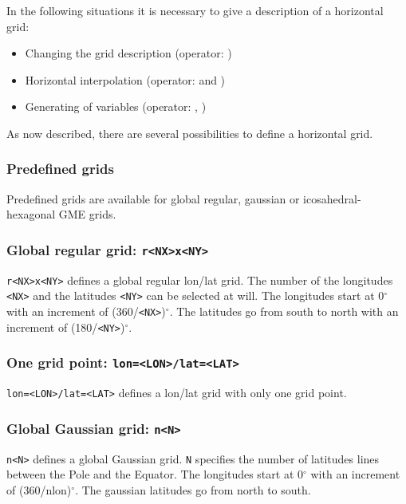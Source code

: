 In the following situations it is necessary to give a description of a horizontal grid:

\begin{itemize}
\item Changing the grid description (operator: )
\item Horizontal interpolation (operator:  and )
\item Generating of variables (operator: , )
\end{itemize}

As now described, there are several possibilities to define a horizontal grid.

\subsubsection{Predefined grids}

Predefined grids are available for global regular, gaussian or icosahedral-hexagonal GME grids.

\subsubsection*{Global regular grid: {\tt r<NX>x<NY>}}
    {\tt r<NX>x<NY>} defines a global regular lon/lat grid.
    The number of the longitudes {\tt <NX>} and the latitudes {\tt <NY>}
    can be selected at will.
    The longitudes start at 0$^\circ$ with an increment of (360/{\tt <NX>})$^\circ$.
    The latitudes go from south to north with an increment of (180/{\tt <NY>})$^\circ$.

\subsubsection*{One grid point: {\tt lon=<LON>/lat=<LAT>}}
    {\tt lon=<LON>/lat=<LAT>} defines a lon/lat grid with only one grid point.

\subsubsection*{Global Gaussian grid: {\tt n<N>}}
    {\tt n<N>} defines a global Gaussian grid. {\tt N} specifies the number of
    latitudes lines between the Pole and the Equator.
    The longitudes start at 0$^\circ$ with an increment of (360/nlon)$^\circ$.
    The gaussian latitudes go from north to south.

